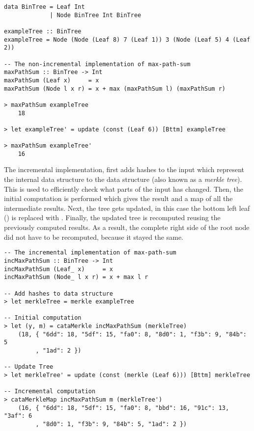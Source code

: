 \begin{verbatim}
data BinTree = Leaf Int
             | Node BinTree Int BinTree 
             
exampleTree :: BinTree    
exampleTree = Node (Node (Leaf 8) 7 (Leaf 1)) 3 (Node (Leaf 5) 4 (Leaf 2))

-- The non-incremental implementation of max-path-sum
maxPathSum :: BinTree -> Int
maxPathSum (Leaf x)     = x
maxPathSum (Node l x r) = x + max (maxPathSum l) (maxPathSum r)

> maxPathSum exampleTree
    18

> let exampleTree' = update (const (Leaf 6)) [Bttm] exampleTree

> maxPathSum exampleTree'
    16
\end{verbatim}

The incremental implementation, first adds hashes to the input which represent the internal data structure to the data structure (also known as a \textit{merkle tree}). This is used to efficiently check what parts of the input has changed. Then, the initial computation is performed which gives the result and a map of all the intermediate results. Next, the tree gets updated, in this case the bottom left leaf () is replaced with . Finally, the updated tree is recomputed reusing the previously computed results. As a result, the complete right side of the root node did not have to be recomputed, because it stayed the same.

\begin{verbatim}
-- The incremental implementation of max-path-sum
incMaxPathSum :: BinTree -> Int
incMaxPathSum (Leaf_ x)     = x
incMaxPathSum (Node_ l x r) = x + max l r

-- Add hashes to data structure
> let merkleTree = merkle exampleTree

-- Initial computation
> let (y, m) = cataMerkle incMaxPathSum (merkleTree)
    (18, { "6dd": 18, "5df": 15, "fa0": 8, "8d0": 1, "f3b": 9, "84b": 5
         , "1ad": 2 })

-- Update Tree
> let merkleTree' = update (const (merkle (Leaf 6))) [Bttm] merkleTree

-- Incremental computation
> cataMerkleMap incMaxPathSum m (merkleTree')
    (16, { "6dd": 18, "5df": 15, "fa0": 8, "bbd": 16, "91c": 13, "3af": 6
         , "8d0": 1, "f3b": 9, "84b": 5, "1ad": 2 })
\end{verbatim}

